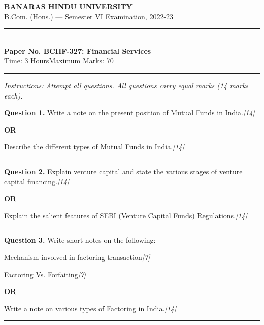 \documentclass[11pt,a4paper]{article}
\newcommand{\pts}[1]{\hfill   \textit{[#1]}}
\begin{document}
\begin{center}
  {\large\bfseries BANARAS HINDU UNIVERSITY}\\[2pt]
  {\normalsize B.Com. (Hons.) --- Semester VI Examination, 2022-23}\\[6pt]
  \rule{0.8\linewidth}{0.5pt}\\[6pt]
  {\large\bfseries Paper No. BCHF-327: Financial Services}\\[4pt]
  {\normalsize Time: 3 Hours\hfill Maximum Marks: 70}
\end{center}

\rule{\linewidth}{0.4pt}

\smallskip



\noindent   \textit{Instructions: Attempt all questions. All questions carry equal marks (14 marks each).}

\bigskip




\noindent   \textbf{Question 1.}
Write a note on the present position of Mutual Funds in India.\pts{14}

\centerline{   \textbf{OR}}

Describe the different types of Mutual Funds in India.\pts{14}

\medskip\rule{\linewidth}{0.2pt}




\noindent   \textbf{Question 2.}
Explain venture capital and state the various stages of venture capital financing.\pts{14}

\centerline{   \textbf{OR}}

Explain the salient features of SEBI (Venture Capital Funds) Regulations.\pts{14}

\medskip\rule{\linewidth}{0.2pt}




\noindent   \textbf{Question 3.}
Write short notes on the following:

\begin{parts}
  \item Mechanism involved in factoring transaction\pts{7}
  \item Factoring Vs. Forfaiting\pts{7}
\end{parts}

\centerline{   \textbf{OR}}

Write a note on various types of Factoring in India.\pts{14}

\medskip\rule{\linewidth}{0.2pt}
\end{document}
